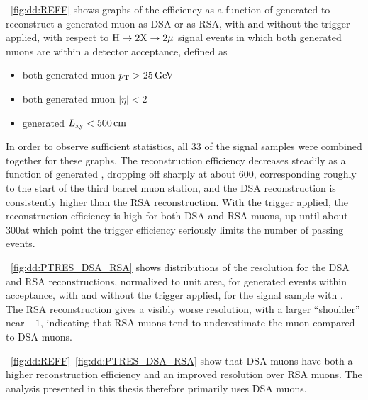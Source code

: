 \Fig~\ref{fig:dd:REFF} shows graphs of the efficiency as a function of generated \Lxy to reconstruct a generated muon as DSA or as RSA, with and without the trigger applied, with respect to \mbox{$\mathrm{H}\to2\mathrm{X}\to2\mathrm{\mu}$} signal events in which both generated muons are within a detector acceptance, defined as
\begin{itemize}
  \item both generated muon $p_{\mathrm{T}} > 25\,\text{Ge\hspace{-.08em}V}$
  \item both generated muon $|\eta| < 2$
  \item generated \mbox{$L_{\mathrm{xy}} < 500\,\text{cm}$}
\end{itemize}
In order to observe sufficient statistics, all 33 of the \twoMu signal samples were combined together for these graphs.
The reconstruction efficiency decreases steadily as a function of generated \Lxy, dropping off sharply at about 600\cm, corresponding roughly to the start of the third barrel muon station, and the DSA reconstruction is consistently higher than the RSA reconstruction.
With the trigger applied, the reconstruction efficiency is high for both DSA and RSA muons, up until about 300\cm at which point the trigger efficiency seriously limits the number of passing events.

\Fig~\ref{fig:dd:PTRES_DSA_RSA} shows distributions of the \pT resolution for the DSA and RSA reconstructions, normalized to unit area, for generated events within acceptance, with and without the trigger applied, for the \twoMu signal sample with .
The RSA reconstruction gives a visibly worse \pT resolution, with a larger ``shoulder'' near $-1$, indicating that RSA muons tend to underestimate the muon \pT compared to DSA muons.

\Figs~\ref{fig:dd:REFF}--\ref{fig:dd:PTRES_DSA_RSA} show that DSA muons have both a higher reconstruction efficiency and an improved \pT resolution over RSA muons.
The analysis presented in this thesis therefore primarily uses DSA muons.

